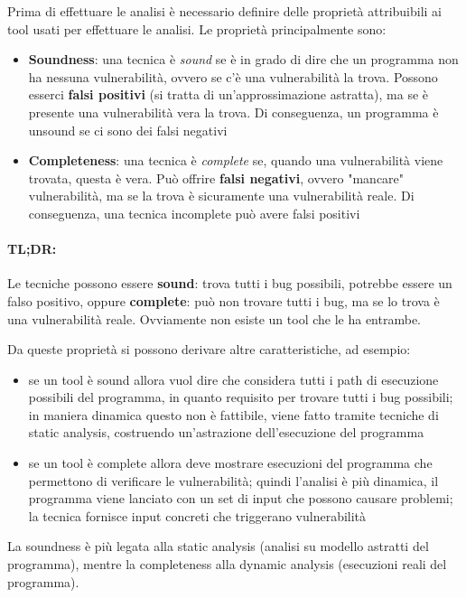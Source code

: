 Prima di effettuare le analisi è necessario definire delle proprietà attribuibili ai tool usati per effettuare le analisi. Le proprietà principalmente sono:
\begin{itemize}
	\item \textbf{Soundness}: una tecnica è \textit{sound} se è in grado di dire che un programma non ha nessuna vulnerabilità, ovvero se c'è una vulnerabilità la trova. Possono esserci \textbf{falsi positivi} (si tratta di un'approssimazione astratta), ma se è presente una vulnerabilità vera la trova. Di conseguenza, un programma è unsound se ci sono dei falsi negativi
    
	\item \textbf{Completeness}: una tecnica è \textit{complete} se, quando una vulnerabilità viene trovata, questa è vera. Può offrire \textbf{falsi negativi}, ovvero "mancare" vulnerabilità, ma se la trova è sicuramente una vulnerabilità reale. Di conseguenza, una tecnica incomplete può avere falsi positivi
\end{itemize}

\paragraph{TL;DR:} Le tecniche possono essere \textbf{sound}: trova tutti i bug possibili, potrebbe essere un falso positivo, oppure \textbf{complete}: può non trovare tutti i bug, ma se lo trova è una vulnerabilità reale. Ovviamente non esiste un tool che le ha entrambe.

Da queste proprietà si possono derivare altre caratteristiche, ad esempio:
\begin{itemize}
	\item se un tool è sound allora vuol dire che considera tutti i path di esecuzione possibili del programma, in quanto requisito per trovare tutti i bug possibili; in maniera dinamica questo non è fattibile, viene fatto tramite tecniche di static analysis, costruendo un'astrazione dell'esecuzione del programma
    
	\item se un tool è complete allora deve mostrare esecuzioni del programma che permettono di verificare le vulnerabilità; quindi l'analisi è più dinamica, il programma viene lanciato con un set di input che possono causare problemi; la tecnica fornisce input concreti che triggerano vulnerabilità
\end{itemize}

La soundness è più legata alla static analysis (analisi su modello astratti del programma), mentre la completeness alla dynamic analysis (esecuzioni reali del programma).

